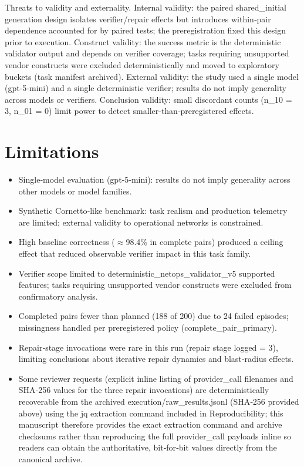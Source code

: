 \documentclass[conference]{IEEEtran}
\begin{document}
Threats to validity and externality. Internal validity: the paired shared\_initial generation design isolates verifier/repair effects but introduces within‑pair dependence accounted for by paired tests; the preregistration fixed this design prior to execution. Construct validity: the success metric is the deterministic validator output and depends on verifier coverage; tasks requiring unsupported vendor constructs were excluded deterministically and moved to exploratory buckets (task manifest archived). External validity: the study used a single model (gpt‑5‑mini) and a single deterministic verifier; results do not imply generality across models or verifiers. Conclusion validity: small discordant counts (n\_10 = 3, n\_01 = 0) limit power to detect smaller-than‑preregistered effects.

\section{Limitations}
\begin{itemize}
\item Single‑model evaluation (gpt‑5‑mini): results do not imply generality across other models or model families.
\item Synthetic Cornetto‑like benchmark: task realism and production telemetry are limited; external validity to operational networks is constrained.
\item High baseline correctness (\ensuremath{\approx}98.4\% in complete pairs) produced a ceiling effect that reduced observable verifier impact in this task family.
\item Verifier scope limited to deterministic\_netops\_validator\_v5 supported features; tasks requiring unsupported vendor constructs were excluded from confirmatory analysis.
\item Completed pairs fewer than planned (188 of 200) due to 24 failed episodes; missingness handled per preregistered policy (complete\_pair\_primary).
\item Repair‑stage invocations were rare in this run (repair stage logged = 3), limiting conclusions about iterative repair dynamics and blast‑radius effects.
\item Some reviewer requests (explicit inline listing of provider\_call filenames and SHA‑256 values for the three repair invocations) are deterministically recoverable from the archived execution/raw\_results.jsonl (SHA‑256 provided above) using the jq extraction command included in Reproducibility; this manuscript therefore provides the exact extraction command and archive checksums rather than reproducing the full provider\_call payloads inline so readers can obtain the authoritative, bit‑for‑bit values directly from the canonical archive.
\end{itemize}
\end{document}
